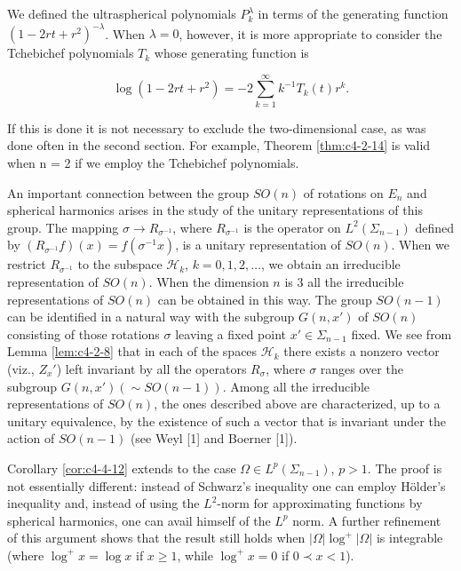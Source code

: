  We defined the ultraspherical polynomials $P_k^\lambda$ in terms of the generating function $(1 - 2rt + r^2)^{-\lambda}$. When $\lambda = 0$, however, it is more appropriate to consider the Tchebichef polynomials $T_k$ whose generating function is

\[
\log\left(1-2r t+r^{2}\right)=-2\sum_{k=1}^{\infty}k^{-1}T_{k}(t)r^{k}.
\]

If this is done it is not necessary to exclude the two-dimensional case, as was done often in the second section. For example, Theorem \ref{thm:c4-2-14} is valid when n = 2 if we employ the Tchebichef polynomials.

 An important connection between the group $SO(n)$ of rotations on $E_n$ and spherical harmonics arises in the study of the unitary representations of this group. The mapping $\sigma \to R_{\sigma^{-1}}$, where $R_{\sigma^{-1}}$ is the operator on $L^2(\Sigma_{n-1})$ defined by $(R_{\sigma^{-1}}f)(x) = f(\sigma^{-1}x)$, is a unitary representation of $SO(n)$. When we restrict $R_{\sigma^{-1}}$ to the subspace $\mathcal{H}_k$, $k = 0, 1, 2, \ldots$, we obtain an irreducible representation of $SO(n)$. When the dimension $n$ is 3 all the irreducible representations of $SO(n)$ can be obtained in this way. The group $SO(n - 1)$ can be identified in a natural way with the subgroup $G(n, x')$ of $SO(n)$ consisting of those rotations $\sigma$ leaving a fixed point $x' \in \Sigma_{n-1}$ fixed. We see from Lemma \ref{lem:c4-2-8} that in each of the spaces $\mathcal{H}_k$ there exists a nonzero vector (viz., $Z_x'$) left invariant by all the operators $R_\sigma$, where $\sigma$ ranges over the subgroup $G(n, x')(\sim SO(n - 1))$. Among all the irreducible representations of $SO(n)$, the ones described above are characterized, up to a unitary equivalence, by the existence of such a vector that is invariant under the action of $SO(n - 1)$ (see Weyl [1] and Boerner [1]).

 Corollary \ref{cor:c4-4-12} extends to the case $\Omega \in L^p(\Sigma_{n-1})$, $p > 1$. The proof is not essentially different: instead of Schwarz's inequality one can employ Hölder's inequality and, instead of using the $L^2$-norm for approximating functions by spherical harmonics, one can avail himself of the $L^p$ norm. A further refinement of this argument shows that the result still holds when $|\Omega| \log^+ |\Omega|$ is integrable (where $\log^+ x = \log x$ if $x \geq 1$, while $\log^+ x = 0$ if $0 \prec x < 1$).

